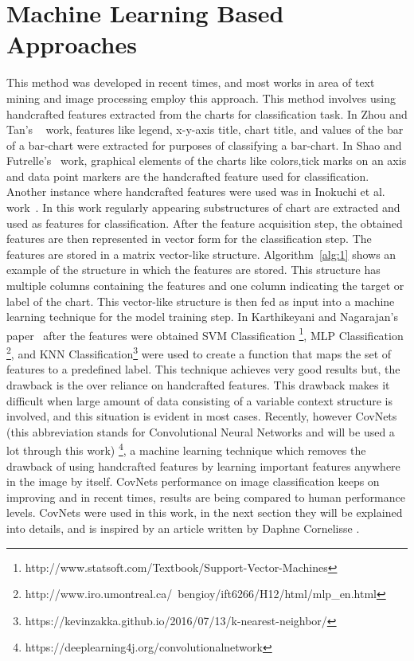\documentclass[12pt, a4paper,oneside]{report}
\begin{document}
\section{Machine Learning Based Approaches}
This method was developed in recent times, and most works in area of text mining and image processing employ this approach. This method 
involves using handcrafted features extracted from the charts for classification task. In Zhou and Tan's ~\cite{zhou2000bar} work, features like legend, x-y-axis title, chart title, and values of the bar of a bar-chart were extracted for purposes of classifying a bar-chart. In Shao and  Futrelle's~\cite{shao2005recognition} work, graphical elements of the charts like colors,tick marks on an axis and data point markers are the handcrafted feature used for classification. Another instance where handcrafted features were used was in Inokuchi et al. work~\cite{inokuchi2000apriori}. In this work regularly appearing substructures of chart are extracted and used as features for classification. After the feature acquisition step, the obtained features are then represented in vector form for the classification step. The features are stored in a matrix vector-like structure. Algorithm~\ref{alg:1} shows an example of the structure in which the features are stored. This structure has multiple columns containing the features and one column indicating the target or label of the chart. This vector-like structure is then fed as input into a machine learning technique for the model training step. In Karthikeyani and Nagarajan's paper~\cite{karthikeyani2012machine} after the features were obtained SVM Classification \footnote{http://www.statsoft.com/Textbook/Support-Vector-Machines}, MLP Classification
\footnote{http://www.iro.umontreal.ca/~bengioy/ift6266/H12/html/mlp\_en.html}, and  KNN Classification\footnote{
https://kevinzakka.github.io/2016/07/13/k-nearest-neighbor/} were used to create a function that maps the set of features to a predefined label. This technique achieves very good results but, the drawback is the over reliance on handcrafted features. This drawback makes it difficult when large amount of data consisting of a variable context structure is involved, and this situation is evident in most cases. Recently, however CovNets (this abbreviation stands for Convolutional Neural Networks and will be used a lot through this work) \footnote{https://deeplearning4j.org/convolutionalnetwork}, a machine learning technique which removes the drawback of using handcrafted features by learning important features anywhere in the image by itself. CovNets performance on image classification keeps on improving and in recent times, results are being compared to human performance levels. CovNets were used in this work, in the next section they will be explained into details, and is inspired by an article written by Daphne Cornelisse \cite{covnet}.\newline
\end{document}
